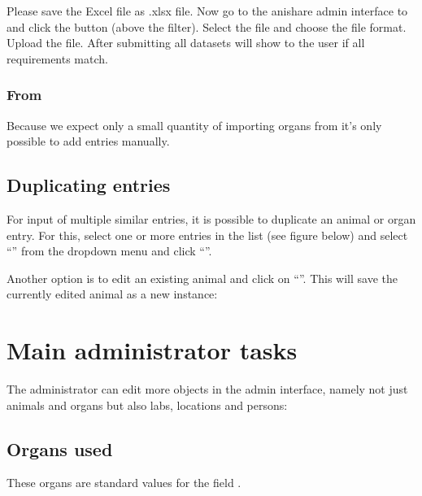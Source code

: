 \documentclass[letterpaper,10pt,openany,oneside,english]{sphinxmanual}
\begin{document}
Please save the Excel file as .xlsx file. Now go to the anishare admin interface to 
and click the button  (above the filter). Select the file and choose the file format. Upload the file. After submitting all datasets will show to
the user if all requirements match.


\subsection{From }
\label{\detokenize{index:id4}}
Because we expect only a small quantity of importing organs from  it’s only possible to add entries manually.


\section{Duplicating entries}
\label{\detokenize{index:duplicating-entries}}
For input of multiple similar entries, it is possible to duplicate an animal or organ entry. For this, select one
or more entries in the list (see figure below) and select “” from the dropdown menu and click
“”.

\noindent{}

Another option is to edit an existing animal and click on “”. This will save the
currently edited animal as a new instance:

\noindent{}


\chapter{Main administrator tasks}
\label{\detokenize{index:main-administrator-tasks}}
The administrator can edit more objects in the admin interface, namely not just animals and organs
but also labs, locations and persons:

\noindent{}


\section{Organs used}
\label{\detokenize{index:organs-used}}
These organs are standard values for the field .
\end{document}
